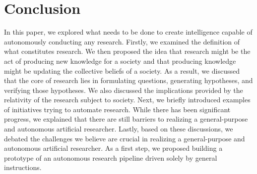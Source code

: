 

\section{Conclusion}
In this paper, we explored what needs to be done to create intelligence capable of autonomously conducting any research. Firstly, we examined the definition of what constitutes research. We then proposed the idea that research might be the act of producing new knowledge for a society and that producing knowledge might be updating the collective beliefs of a society. As a result, we discussed that the core of research lies in formulating questions, generating hypotheses, and verifying those hypotheses. We also discussed the implications provided by the relativity of the research subject to society. Next, we briefly introduced examples of initiatives trying to automate research. While there has been significant progress, we explained that there are still barriers to realizing a general-purpose and autonomous artificial researcher. Lastly, based on these discussions, we debated the challenges we believe are crucial in realizing a general-purpose and autonomous artificial researcher. As a first step, we proposed building a prototype of an autonomous research pipeline driven solely by general instructions.